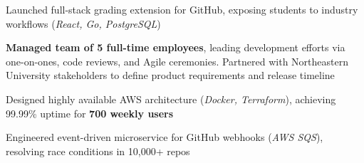 \documentclass[letterpaper,11pt]{article}
\newcommand{\resumeItem}[1]{
  \item\small{
    {#1 \vspace{-1pt}}
  }
}
\begin{document}
        \resumeItem{Launched full-stack grading extension for GitHub, exposing students to industry workflows (\textit{React, Go, PostgreSQL})}
        
        \resumeItem{\textbf{Managed team of 5 full-time employees}, leading development efforts via one-on-ones, code reviews, and Agile ceremonies. Partnered with Northeastern University stakeholders to define product requirements and release timeline}

        \resumeItem{Designed highly available AWS architecture (\textit{Docker, Terraform}), achieving 99.99\% uptime for \textbf{700 weekly users}}
        \resumeItem{Engineered event-driven microservice for GitHub webhooks (\textit{AWS SQS}), resolving race conditions in 10,000+ repos}
        
        
\end{document}
